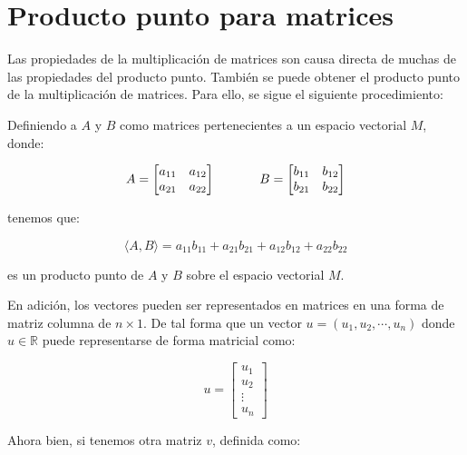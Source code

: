 \documentclass{article}
\begin{document}
\section{Producto punto para matrices}

    Las propiedades de la multiplicación de matrices son causa directa de muchas de las propiedades del producto punto. También se puede obtener el producto punto de la multiplicación de matrices. Para ello, se sigue el siguiente procedimiento:

    Definiendo a $A$ y $B$ como matrices pertenecientes a un espacio vectorial $M$, donde:

    \begin{gather}
        A = \begin{bmatrix}
           a_{11} & a_{12} \\
           a_{21} & a_{22}
        \end{bmatrix} \hspace{35 pt}
        B = \begin{bmatrix}
            b_{11} & b_{12} \\
            b_{21} & b_{22}
        \end{bmatrix}
    \end{gather}

    tenemos que:

    \begin{equation}
        \langle A, B\rangle=a_{11} b_{11}+a_{21} b_{21}+a_{12} b_{12}+a_{22} b_{22}
    \end{equation}

    es un producto punto de $A$ y $B$ sobre el espacio vectorial $M$.

    En adición, los vectores pueden ser representados en matrices en una forma de matriz columna de $n\times1$. De tal forma que un vector $u = (u_1, u_2, \cdots, u_n)$ donde $u \in \mathbb{R}$ puede representarse de forma matricial como:

    \begin{equation}
        u=\left[\begin{array}{c}
        u_{1} \\
        u_{2} \\
        \vdots \\
        u_{n}
        \end{array}\right]
    \end{equation}

    Ahora bien, si tenemos otra matriz $v$, definida como:
\end{document}
